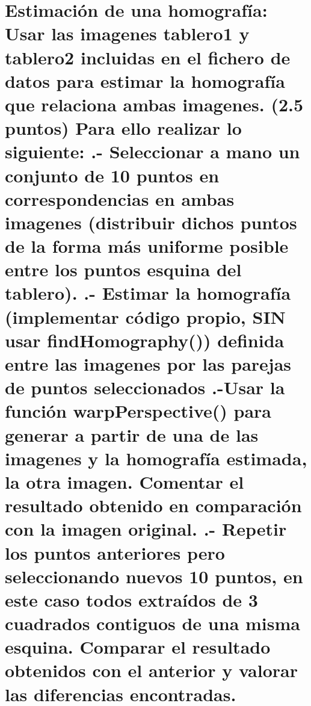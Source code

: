 \section{Estimación de una homografía: Usar las imagenes tablero1 y tablero2
incluidas en el fichero de datos para estimar la homografía que relaciona
ambas imagenes. (2.5 puntos) \newline
Para ello realizar lo siguiente: .- Seleccionar a mano un conjunto de 10 puntos en correspondencias
en ambas imagenes (distribuir dichos puntos de la forma más uniforme posible
entre los puntos esquina del tablero). .- Estimar la homografía (implementar código propio, SIN usar
findHomography()) definida entre las imagenes por las parejas de puntos
seleccionados .-Usar la función warpPerspective() para generar a partir de una de las
imagenes y la homografía estimada, la otra imagen. Comentar el resultado
obtenido en comparación con la imagen original. .- Repetir los puntos anteriores pero seleccionando nuevos 10 puntos,
en este caso todos extraídos de 3 cuadrados contiguos de una misma esquina.
Comparar el resultado obtenidos con el anterior y valorar las diferencias
encontradas.}


